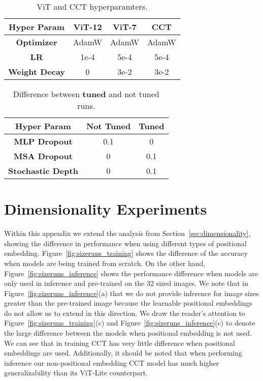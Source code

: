 \documentclass[10pt,twocolumn,letterpaper]{article}
\begin{document}
\begin{table}[ht]
    \small
    \centering
    \begin{tabular}{c|ccc}
        \toprule
        \textbf{Hyper Param} & \textbf{ViT-12} & \textbf{ViT-7} & \textbf{CCT} \\
        \midrule
        \textbf{Optimizer} & AdamW & AdamW & AdamW \\
        \textbf{LR} & 1e-4 & 5e-4 & 5e-4 \\
        \textbf{Weight Decay} & 0 & 3e-2 & 3e-2 \\
        \bottomrule
    \end{tabular}
    \caption{ViT and CCT hyperparamters.}
    \label{tab:vit_comparison_hyperparams}
\end{table}
\begin{table}[ht]
    \small
    \centering
    \begin{tabular}{c|cc}
        \toprule
        \textbf{Hyper Param} & \textbf{Not Tuned} & \textbf{Tuned} \\
        \midrule
        \textbf{MLP Dropout} & 0.1 & 0 \\
        \textbf{MSA Dropout} & 0 & 0.1 \\
        \textbf{Stochastic Depth} & 0 & 0.1 \\
        \bottomrule
    \end{tabular}
    \caption{Difference between \textbf{tuned} and not tuned runs.}
    \label{tab:tuned_comparison}
\end{table} 
\section{Dimensionality Experiments}
\label{appdx:dimensionality}
Within this appendix we extend the analysis from Section~\ref{sec:dimensionality}, showing the difference in performance when using different types of positional embedding. Figure~\ref{fig:sizeruns_training} shows the difference of the accuracy when models are being trained from scratch. On the other hand, Figure~\ref{fig:sizeruns_inference} shows the performance difference when models are only used in inference and pre-trained on the 32 sized images. We note that in Figure~\ref{fig:sizeruns_inference}(a) that we do not provide inference for image sizes greater than the pre-trained image because the learnable positional embeddings do not allow us to extend in this direction. 
We draw the reader's attention to Figure~\ref{fig:sizeruns_training}(c) and Figure~\ref{fig:sizeruns_inference}(c) to denote the large difference between the models when positional embedding is not used. 
We can see that in training CCT has very little difference when positional embeddings are used.
Additionally, it should be noted that when performing inference our non-positional embedding CCT model has much higher generalizability than its ViT-Lite counterpart.
\end{document}
